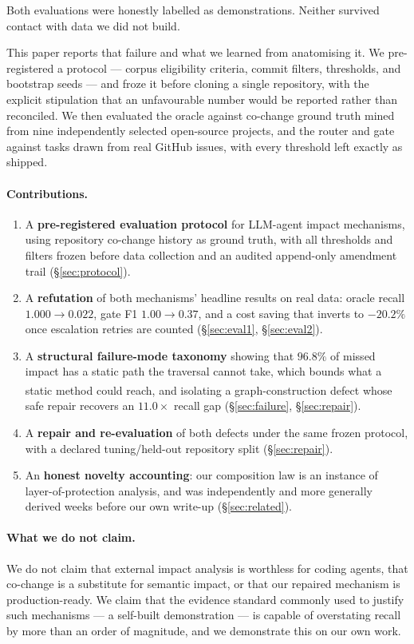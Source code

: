 \documentclass[sigconf,review,anonymous]{acmart}
\newcommand{\corr}{\textsuperscript{\dag}}
\begin{document}
Both evaluations were honestly labelled as demonstrations. Neither survived contact with
data we did not build.

This paper reports that failure and what we learned from anatomising it. We pre-registered
a protocol --- corpus eligibility criteria, commit filters, thresholds, and bootstrap
seeds --- and froze it before cloning a single repository, with the explicit stipulation
that an unfavourable number would be reported rather than reconciled. We then evaluated
the oracle against co-change ground truth mined from nine independently selected
open-source projects, and the router and gate against tasks drawn from real GitHub issues,
with every threshold left exactly as shipped.

\paragraph{Contributions.}
\begin{enumerate}
\item A \textbf{pre-registered evaluation protocol} for LLM-agent impact mechanisms, using
repository co-change history as ground truth, with all thresholds and filters frozen before
data collection and an audited append-only amendment trail (\S\ref{sec:protocol}).
\item A \textbf{refutation} of both mechanisms' headline results on real data: oracle recall
$1.000 \rightarrow 0.022$, gate F1 $1.00 \rightarrow 0.37$, and a cost saving that
inverts to $-20.2\%$ once escalation retries are counted (\S\ref{sec:eval1}, \S\ref{sec:eval2}).
\item A \textbf{structural failure-mode taxonomy} showing that $96.8\%$ of missed impact has a
static path the traversal cannot take, which bounds what a static method could reach\corr{}, and isolating a
graph-construction defect whose safe repair recovers an $11.0\times$ recall gap
(\S\ref{sec:failure}, \S\ref{sec:repair}).
\item A \textbf{repair and re-evaluation} of both defects under the same frozen protocol,
with a declared tuning/held-out repository split (\S\ref{sec:repair}).
\item An \textbf{honest novelty accounting}: our composition law is an instance of
layer-of-protection analysis, and was independently and more generally derived weeks
before our own write-up (\S\ref{sec:related}).
\end{enumerate}

\paragraph{What we do not claim.} We do not claim that external impact analysis is
worthless for coding agents, that co-change is a substitute for semantic impact, or that
our repaired mechanism is production-ready. We claim that the evidence standard commonly
used to justify such mechanisms --- a self-built demonstration --- is capable of
overstating recall by more than an order of magnitude, and we demonstrate this on our own
work.
\end{document}
